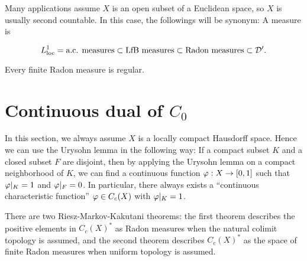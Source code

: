 \documentclass{../note}
\begin{document}
Many applications assume $X$ is an open subset of a Euclidean space, so $X$ is usually second countable.
In this case, the followings will be synonym: A measure is
\begin{parts}
\item 
\end{parts}



\[L_{\text{loc}}^1=\text{a.c. measures}\subset\text{LfB measures}\subset\text{Radon measures}\subset\mathcal{D}'.\]


\begin{thm}
Every finite Radon measure is regular.
\end{thm}







\section{Continuous dual of $C_0$}
In this section, we always assume $X$ is a locally compact Hausdorff space.
Hence we can use the Urysohn lemma in the following way: If a compact subset $K$ and a closed subset $F$ are disjoint, then by applying the Urysohn lemma on a compact neighborhood of $K$, we can find a continuous function $\varphi:X\to[0,1]$ such that $\varphi|_K=1$ and $\varphi|_F=0$.
In particular, there always exists a ``continuous characteristic function'' $\varphi\in C_c(X)$ with $\varphi|_K=1$.

There are two Riesz-Markov-Kakutani theorems: the first theorem describes the positive elements in $C_c(X)^*$ as Radon measures when the natural colimit topology is assumed, and the second theorem describes $C_c(X)^*$ as the space of finite Radon measures when uniform topology is assumed.
\end{document}
